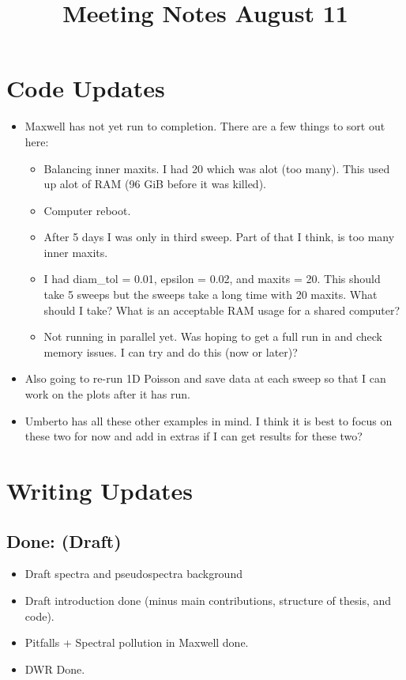 \documentclass[12pt,a4paper]{article}
\title{Meeting Notes August 11}
\author{}
\date{}
\begin{document}
\maketitle


\section{Code Updates}

\begin{itemize}
    \item Maxwell has not yet run to completion. There are a few things to sort out here:
    \begin{itemize}
        \item Balancing inner maxits. I had 20 which was alot (too many). This used up alot of RAM (96 GiB before it was killed). 
        \item Computer reboot.
        \item After 5 days I was only in third sweep. Part of that I think, is too many inner maxits. 
        \item I had diam\_tol = 0.01, epsilon = 0.02, and maxits = 20. This should take 5 sweeps but the sweeps take a long time with 20 maxits. What should I take? What is an acceptable RAM usage for a shared computer?
        \item Not running in parallel yet. Was hoping to get a full run in and check memory issues. I can try and do this (now or later)? 
    \end{itemize}
    \item Also going to re-run 1D Poisson and save data at each sweep so that I can work on the plots after it has run. 
    \item Umberto has all these other examples in mind. I think it is best to focus on these two for now and add in extras if I can get results for these two?
\end{itemize}



\section{Writing Updates}

\subsection{Done: (Draft)}
\begin{itemize}
    \item Draft spectra and pseudospectra background
    \item Draft introduction done (minus main contributions, structure of thesis, and code).
    \item Pitfalls + Spectral pollution in Maxwell done.
    \item DWR Done.
\end{itemize}
\end{document}
